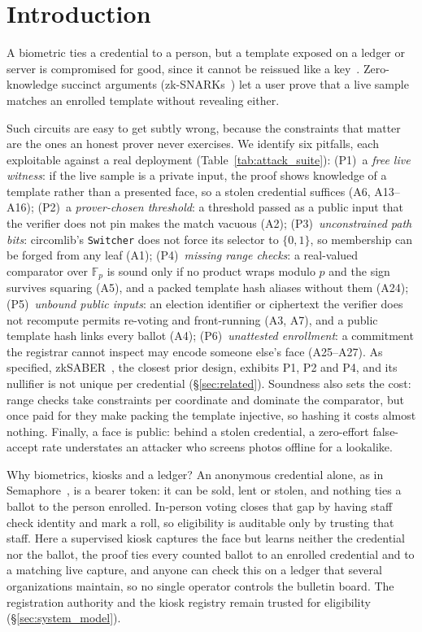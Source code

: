 \documentclass[10pt,letterpaper,journal]{IEEEtran}
\begin{document}
\section{Introduction}
\label{sec:intro}

A biometric ties a credential to a person, but a template exposed on a ledger or server is compromised for good, since it cannot be reissued like a key~\cite{Jain2008,Rathgeb2011}. Zero-knowledge succinct arguments (zk-SNARKs~\cite{Groth2016}) let a user prove that a live sample matches an enrolled template without revealing either.

Such circuits are easy to get subtly wrong, because the constraints that matter are the ones an honest prover never exercises. We identify six pitfalls, each exploitable against a real deployment (Table~\ref{tab:attack_suite}):
(P1)~a \emph{free live witness}: if the live sample is a private input, the proof shows knowledge of a template rather than a presented face, so a stolen credential suffices (A6, A13--A16);
(P2)~a \emph{prover-chosen threshold}: a threshold passed as a public input that the verifier does not pin makes the match vacuous (A2);
(P3)~\emph{unconstrained path bits}: circomlib's \texttt{Switcher} does not force its selector to $\{0,1\}$, so membership can be forged from any leaf (A1);
(P4)~\emph{missing range checks}: a real-valued comparator over $\mathbb{F}_p$ is sound only if no product wraps modulo $p$ and the sign survives squaring (A5), and a packed template hash aliases without them (A24);
(P5)~\emph{unbound public inputs}: an election identifier or ciphertext the verifier does not recompute permits re-voting and front-running (A3, A7), and a public template hash links every ballot (A4);
(P6)~\emph{unattested enrollment}: a commitment the registrar cannot inspect may encode someone else's face (A25--A27).
As specified, zkSABER~\cite{zkSABER2025}, the closest prior design, exhibits P1, P2 and P4, and its nullifier is not unique per credential (\S\ref{sec:related}). Soundness also sets the cost: range checks take \nRangePerCoord{} constraints per coordinate and dominate the comparator, but once paid for they make packing the template injective, so hashing it costs almost nothing. Finally, a face is public: behind a stolen credential, a zero-effort false-accept rate understates an attacker who screens photos offline for a lookalike.

Why biometrics, kiosks and a ledger? An anonymous credential alone, as in Semaphore~\cite{Gurkan2020}, is a bearer token: it can be sold, lent or stolen, and nothing ties a ballot to the person enrolled. In-person voting closes that gap by having staff check identity and mark a roll, so eligibility is auditable only by trusting that staff. Here a supervised kiosk captures the face but learns neither the credential nor the ballot, the proof ties every counted ballot to an enrolled credential and to a matching live capture, and anyone can check this on a ledger that several organizations maintain, so no single operator controls the bulletin board. The registration authority and the kiosk registry remain trusted for eligibility (\S\ref{sec:system_model}).
\end{document}

